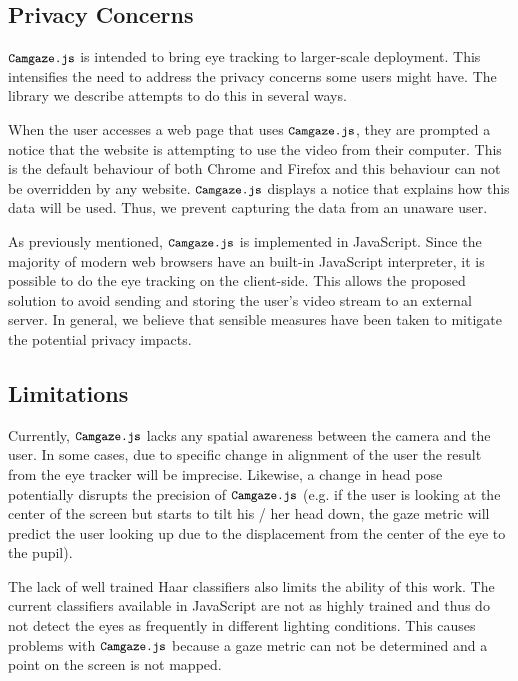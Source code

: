 \documentclass[annual]{acmsiggraph}
\newcommand{\Acronym}[1]{\ensuremath{{\small{\texttt{#1}}}}}
\newcommand{\Name}{\Acronym{Camgaze.js}} \newcommand{\False}{\Constant{false}}
\newcommand{\Constant}[1]{\ensuremath{\small{\texttt{#1}}}}
\begin{document}
\subsection{Privacy Concerns}

$\Name$ is intended to bring eye tracking to larger-scale deployment.  This
intensifies the need to address the privacy concerns some users might have. The
library we describe attempts to do this in several ways.

When the user accesses a web page that uses $\Name$, they are prompted a
notice that the website is attempting to use the video from their computer.
This is the default behaviour of both Chrome and Firefox and this behaviour can
not be overridden by any website. $\Name$ displays a notice that explains how
this data will be used.  Thus, we prevent capturing the data from an unaware
user.

As previously mentioned, $\Name$ is implemented in JavaScript. Since the
majority of modern web browsers have an built-in JavaScript interpreter, it is
possible to do the eye tracking on the client-side. This allows the proposed
solution to avoid sending and storing the user’s video stream to an external
server. In general, we believe that sensible measures have been taken to
mitigate the potential privacy impacts.

\subsection{Limitations}

Currently, $\Name$ lacks any spatial awareness between the camera and the
user. In some cases, due to specific change in alignment of the user the result
from the eye tracker will be imprecise. Likewise, a change in head pose
potentially disrupts the precision of $\Name$ (e.g. if the user is looking at
the center of the screen but starts to tilt his / her head down, the gaze
metric will predict the user looking up due to the displacement from the center
of the eye to the pupil).

The lack of well trained Haar classifiers also limits the ability of this work.
The current classifiers available in JavaScript are not as highly trained and
thus do not detect the eyes as frequently in different lighting conditions.
This causes problems with $\Name$ because a gaze metric can not be determined
and a point on the screen is not mapped.

\end{document}
